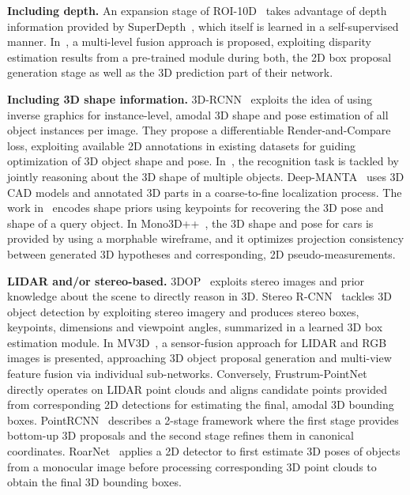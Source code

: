 \documentclass[10pt,twocolumn,letterpaper]{article}
\renewcommand{\paragraph}[1]{

        \vspace{3pt}
	\noindent\textbf{#1}}
\begin{document}
\paragraph{Including depth.} 
An expansion stage of ROI-10D~\cite{Manhardt_2019_CVPR} takes advantage of depth information provided by SuperDepth~\cite{Pillai_2019_ICRA}, which itself is learned in a self-supervised manner. In~\cite{Xu_2018_CVPR}, a multi-level fusion approach is proposed, exploiting disparity estimation results from a pre-trained module during both, the 2D box proposal generation stage as well as the 3D prediction part of their network. 

\paragraph{Including 3D shape information.}
3D-RCNN~\cite{Kundu_2018_CVPR} exploits the idea of using inverse graphics for instance-level, amodal 3D shape and pose estimation of all object instances per image. They propose a differentiable Render-and-Compare loss, exploiting available 2D annotations in existing datasets for guiding optimization of 3D object shape and pose. In~\cite{Zia_2014_CVPR}, the recognition task is tackled by jointly reasoning about the 3D shape of multiple objects. Deep-MANTA~\cite{Chabot_2017_CVPR} uses 3D CAD models and annotated 3D parts in a coarse-to-fine localization process. The work in~\cite{Murthy_17_ICRA} encodes shape priors using keypoints for recovering the 3D pose and shape of a query object. In Mono3D++~\cite{TongHe_2019_arxiv}, the 3D shape and pose for cars is provided by using a morphable wireframe, and it optimizes projection consistency between generated 3D hypotheses and corresponding, 2D pseudo-measurements.

\paragraph{LIDAR and/or stereo-based.}
3DOP~\cite{NIPS2015_Chen} exploits stereo images and prior knowledge about the scene to directly reason in 3D. Stereo R-CNN~\cite{cvpr19stereorcnn} tackles 3D object detection by exploiting stereo imagery and produces stereo boxes, keypoints, dimensions and viewpoint angles, summarized in a learned 3D box estimation module. In MV3D~\cite{Chen_2017_CVPR}, a sensor-fusion approach for LIDAR and RGB images is presented, approaching 3D object proposal generation and multi-view feature fusion via individual sub-networks. Conversely, Frustrum-PointNet~\cite{Qi_2018_CVPR} directly operates on LIDAR point clouds and aligns candidate points provided from corresponding 2D detections for estimating the final, amodal 3D bounding boxes. PointRCNN~\cite{shi2018pointrcnn} describes a 2-stage framework where the first stage provides bottom-up 3D proposals and the second stage refines them in canonical coordinates. RoarNet~\cite{Shin_arxiv_18} applies a 2D detector to first estimate 3D poses of objects from a monocular image before processing corresponding 3D point clouds to obtain the final 3D bounding boxes. 
\end{document}
